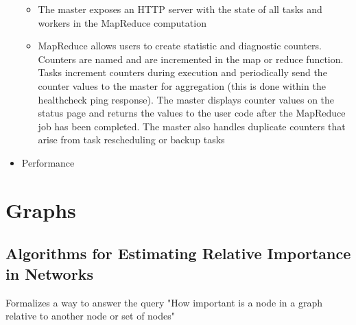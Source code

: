 \documentclass[a4paper]{article}
\begin{document}
\begin{itemize}
\begin{itemize}
\item The master exposes an HTTP server with the state of all tasks and workers in the MapReduce computation

\item MapReduce allows users to create statistic and diagnostic counters. Counters are named and are incremented in the map or reduce function. Tasks increment counters during execution and periodically send the counter values to the master for aggregation (this is done within the healthcheck ping response). The master displays counter values on the status page and returns the values to the user code after the MapReduce job has been completed. The master also handles duplicate counters that arise from task rescheduling or backup tasks 

\end{itemize}

\item Performance


\end{itemize}


\section{Graphs}

\subsection{Algorithms for Estimating Relative Importance in Networks}

Formalizes a way to answer the query "How important is a node in a graph relative to another node or set of nodes"
\end{document}
